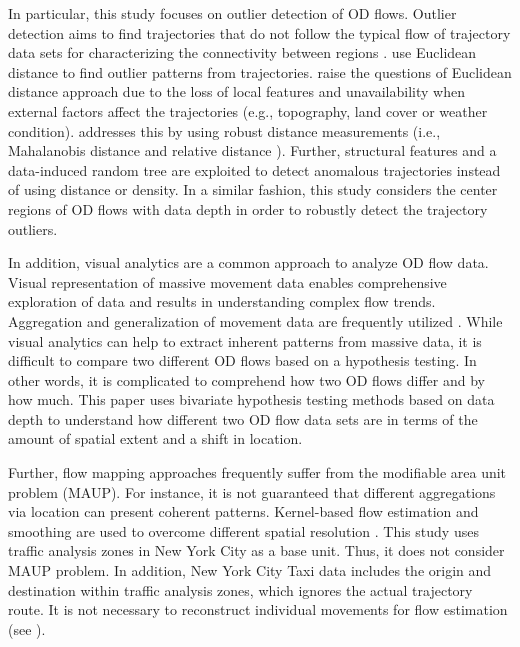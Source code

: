 \documentclass[a4paper,UKenglish]{lipics-v2016}
\begin{document}
In particular, this study focuses on outlier detection of OD flows. Outlier detection aims to find trajectories that do not follow the typical flow of trajectory data sets for characterizing the connectivity between regions \cite{mazimpaka16JOSIS}. \cite{fontes13GeoInfo,lee08ICDE} use Euclidean distance to find outlier patterns from trajectories.  \cite{pan13ACMGIS,liu12IJGIS} raise the questions of Euclidean distance approach due to the loss of local features and unavailability when external factors affect the trajectories (e.g., topography, land cover or weather condition).  \cite{pan13ACMGIS,liu12IJGIS} addresses this by using robust distance measurements (i.e., Mahalanobis distance \cite{pan13ACMGIS} and relative distance  \cite{liu12IJGIS}). Further, structural features  \cite{yuan11JCIS} and a data-induced random tree  \cite{zhang11UC} are exploited to detect anomalous trajectories instead of using distance or density. In a similar fashion, this study considers the center regions of OD flows with data depth in order to robustly detect the trajectory outliers. 



In addition, visual analytics are a common approach to analyze OD flow data. Visual representation of massive movement data enables comprehensive exploration of data and results in understanding complex flow trends. Aggregation and generalization of movement data are frequently utilized \cite{andrienko08VAST,adrienko11IEEETVCG,guo14IEEETVCG}. While visual analytics can help to extract inherent patterns from massive data, it is difficult to compare two different OD flows based on a hypothesis testing. In other words, it is complicated to comprehend how two OD flows differ and by how much. This paper uses bivariate hypothesis testing methods based on data depth to understand how different two OD flow data sets are in terms of the amount of spatial extent and a shift in location. 


Further, flow mapping approaches frequently suffer from the modifiable area unit problem (MAUP). For instance, it is not guaranteed that different aggregations via location can present coherent patterns. Kernel-based flow estimation and smoothing are used to overcome different spatial resolution \cite{guo14IEEETVCG}. This study uses traffic analysis zones in New York City as a base unit. Thus, it does not consider MAUP problem. In addition, New York City Taxi data includes the origin and destination within traffic analysis zones, which ignores the actual trajectory route. It is not necessary to reconstruct individual movements for flow estimation (see \cite{duckham16ICGIS}).
\end{document}
